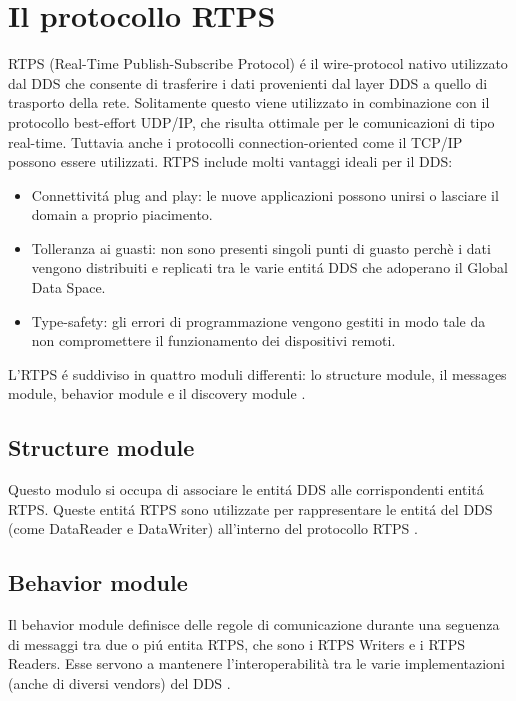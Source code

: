 \section{Il protocollo RTPS}
RTPS (Real-Time Publish-Subscribe Protocol) é il wire-protocol 
nativo utilizzato dal DDS che consente di trasferire i dati provenienti
dal layer DDS a quello di trasporto della rete.
Solitamente questo viene utilizzato in combinazione con il protocollo
best-effort
UDP/IP, che risulta ottimale per le comunicazioni di tipo real-time. Tuttavia 
anche i protocolli connection-oriented come il TCP/IP possono essere utilizzati. 
RTPS include molti vantaggi ideali per il DDS:
\begin{itemize}
    \item Connettivitá plug and play: le nuove applicazioni possono unirsi o 
    lasciare il domain a proprio piacimento.
    \item Tolleranza ai guasti: non sono presenti singoli punti di 
    guasto perchè i dati vengono distribuiti e replicati tra le varie 
    entitá DDS che adoperano il Global Data Space.
    \item Type-safety: gli errori di programmazione vengono gestiti 
    in modo tale da non compromettere il funzionamento 
    dei dispositivi remoti.
\end{itemize}
L'RTPS é suddiviso in quattro moduli differenti: lo structure module, il 
messages module, behavior module e il discovery module \cite{ddsrtps}.

\subsection{Structure module}
Questo modulo si occupa di associare le entitá DDS alle corrispondenti
entitá RTPS. Queste entitá RTPS sono utilizzate 
per rappresentare le entitá del DDS (come DataReader e DataWriter) 
all'interno del protocollo RTPS \cite{ddsrtps}.

\subsection{Behavior module}
Il behavior module definisce delle regole di comunicazione durante 
una seguenza di messaggi tra
due o piú entita RTPS, che sono i RTPS Writers e i RTPS Readers.
Esse servono a mantenere l'interoperabilità tra le varie 
implementazioni (anche di diversi vendors) del DDS \cite{ddsrtps}.

